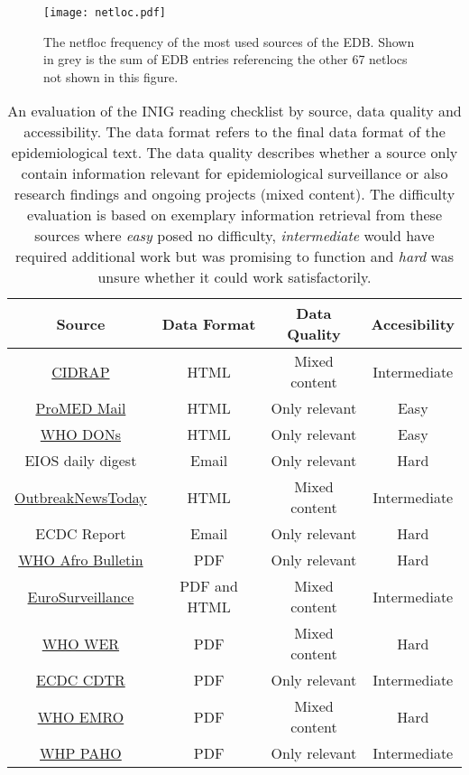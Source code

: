 \begin{figure}
  \centering
  \texttt{[image: netloc.pdf]}
  \caption{The netfloc frequency of the most used sources of the EDB. Shown in grey is the sum of EDB entries referencing the other 67 netlocs not shown in this figure.}
\label{fig:netloc}
\end{figure}


\begin{table}
  \centering
  \begin{tabular}{@{}cccc@{}}
    \toprule
    \textbf{Source} & \textbf{Data Format} & \textbf{Data Quality} & \textbf{Accesibility}\\
    \midrule
    \href{http://www.cidrap.umn.edu/}{CIDRAP} & HTML & Mixed content & Intermediate \\
    \href{http://www.promedmail.org/}{ProMED Mail} & HTML & Only relevant & Easy\\
    \href{http://www.who.int/csr/don/en/}{WHO DONs} & HTML & Only relevant & Easy \\
    EIOS daily digest & Email & Only relevant & Hard \\
    \href{http://outbreaknewstoday.com/}{OutbreakNewsToday} & HTML & Mixed content & Intermediate\\
    ECDC Report & Email & Only relevant & Hard \\
    \href{http://www.afro.who.int/fr/health-topics/disease-outbreaks/outbreaks-and-other-emergencies-updates}{WHO Afro Bulletin} & PDF & Only relevant & Hard \\
    \href{http://www.eurosurveillance.org/content/eurosurveillance/browse}{EuroSurveillance} & PDF and HTML & Mixed content & Intermediate \\
    \href{http://www.who.int/wer/en/}{WHO WER} & PDF & Mixed content & Hard\\
    \href{https://ecdc.europa.eu/en/threats-and-outbreaks/reports-and-data/weekly-threats}{ECDC CDTR} & PDF & Only relevant & Intermediate \\
    \href{http://www.emro.who.int/pandemic-epidemic-diseases/information-resources/weekly-epidemiological-monitor.html}{WHO EMRO} & PDF & Mixed content & Hard \\
    \href{https://www.paho.org/hq/index.php?option=com_content&view=article&id=14044:epidemiological-alerts-archive-by-year-2018&Itemid=72203&lang=en}{WHP PAHO} & PDF & Only relevant & Intermediate\\
    \bottomrule
  \end{tabular}
  \caption{An evaluation of the INIG reading checklist by source, data quality and accessibility. The data format refers to the final data format of the epidemiological text. The data quality describes whether a source only contain information relevant for epidemiological surveillance or also research findings and ongoing projects (mixed content). The difficulty evaluation is based on exemplary information retrieval from these sources where \textsl{easy} posed no difficulty, \textsl{intermediate} would have required additional work but was promising to function and \textsl{hard} was unsure whether it could work satisfactorily.}
\label{table:INIGsources}
\end{table}

